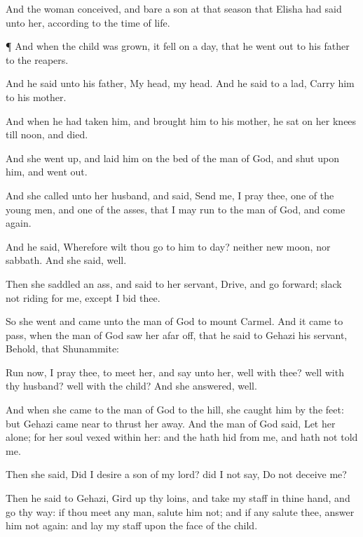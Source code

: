 {And the
woman
conceived, and
bare a
son at that
season that
Elisha had
said unto her, according to the
time of
life.


\par }{\PP {}¶ And when the
child was
grown, it fell on a
day, that he went
out to his
father to the
reapers.

And he
said unto his
father, My
head, my
head. And he
said to a
lad,
Carry him to his
mother.

And when he had
taken him, and
brought him to his
mother, he
sat on her
knees till
noon, and
{}
died.

And she went
up, and
laid him on the
bed of the
man of
God, and
shut
{} upon him, and went
out.

And she
called unto her
husband, and
said,
Send me, I pray thee,
one of the young
men, and
one of the
asses, that I may
run to the
man of
God, and come
again.

And he
said, Wherefore wilt thou
go to him to
day?
{} neither new
moon, nor
sabbath. And she
said,
{}
well.

Then she
saddled an
ass, and
said to her
servant,
Drive, and go
forward;
slack not
{}
riding for me, except I
bid thee.

So she
went and
came unto the
man of
God to
mount
Carmel. And it came to pass, when the
man of
God saw her afar
off, that he
said to
Gehazi his
servant, Behold,
{}
that
Shunammite:

Run now, I pray thee, to
meet her, and
say unto her,
{}
well with thee?
{}
well with thy
husband?
{}
well with the
child? And she
answered,
{}
well.

And when she
came to the
man of
God to the
hill, she
caught him by the
feet: but
Gehazi came
near to thrust her
away. And the
man of
God
said, Let her
alone; for her
soul
{}
vexed within her: and the
{} hath
hid
{} from me, and hath not
told me.

Then she
said, Did I
desire a
son of my
lord? did I not
say, Do not
deceive me?

Then he
said to
Gehazi, Gird
up thy
loins, and
take my
staff in thine
hand, and go thy
way: if thou
meet any
man,
salute him not; and if
any
salute thee, answer him not
again: and
lay my
staff upon the
face of the
child.

}
